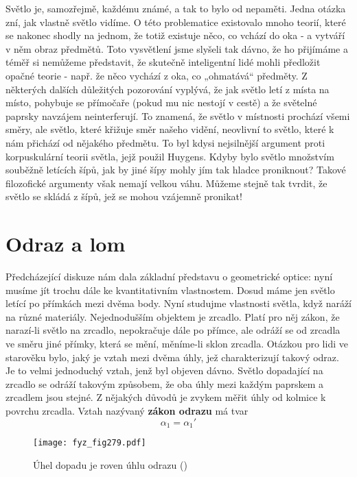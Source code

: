     Světlo je, samozřejmě, každému známé, a tak to bylo od nepaměti. Jedna otázka zní, jak vlastně 
    světlo vidíme. O této problematice existovalo mnoho teorií, které se nakonec shodly na jednom, 
    že totiž existuje něco, co vchází do oka - a vytváří v něm obraz předmětů. Toto vysvětlení jsme 
    slyšeli tak dávno, že ho přijímáme a téměř si nemůžeme představit, že skutečně inteligentní 
    lidé mohli předložit opačné teorie - např. že něco vychází z oka, co „ohmatává“ předměty. Z 
    některých dalších důležitých pozorování vyplývá, že jak světlo letí z místa na místo, pohybuje 
    se přímočaře (pokud mu nic nestojí v cestě) a že světelné paprsky navzájem neinterferují. To 
    znamená, že světlo v místnosti prochází všemi směry, ale světlo, které křižuje směr našeho 
    vidění, neovlivní to světlo, které k nám přichází od nějakého předmětu. To byl kdysi 
    nejsilnější argument proti korpuskulární teorii světla, jejž použil Huygens. Kdyby bylo světlo 
    množstvím souběžně letících šípů, jak by jiné šípy mohly jím tak hladce proniknout? Takové 
    filozofické argumenty však nemají velkou váhu. Můžeme stejně tak tvrdit, že světlo se skládá z 
    šípů, jež se mohou vzájemně pronikat!
    
  \section{Odraz a lom}\label{fyz:IchapXXVIsecII}
    Předcházející diskuze nám dala základní představu o geometrické optice: nyní musíme jít trochu 
    dále ke kvantitativním vlastnostem. Dosud máme jen světlo letící po přímkách mezi dvěma body. 
    Nyní studujme vlastnosti světla, když naráží na různé materiály. Nejednodušším objektem je 
    zrcadlo. Platí pro něj zákon, že narazí-li světlo na zrcadlo, nepokračuje dále po přímce, ale 
    odráží se od zrcadla ve směru jiné přímky, která se mění, měníme-li sklon zrcadla. Otázkou pro 
    lidi ve starověku bylo, jaký je vztah mezi dvěma úhly, jež charakterizují takový odraz. Je to 
    velmi jednoduchý vztah, jenž byl objeven dávno. Světlo dopadající na zrcadlo se odráží takovým 
    způsobem, že oba úhly mezi každým paprskem a zrcadlem jsou stejné. Z nějakých důvodů je zvykem 
    měřit úhly od kolmice k povrchu zrcadla. Vztah nazývaný \textbf{zákon odrazu} má tvar
    \begin{equation}\label{fyz:eq336}
      \alpha_1 = \alpha_1'
    \end{equation}
    
    \begin{figure}[ht!] %
      \centering
      \texttt{[image: fyz\_fig279.pdf]}
      \caption{Úhel dopadu je roven úhlu odrazu
               (\cite[s.~346]{Feynman01})}
      \label{fyz:fig279}
    \end{figure}

